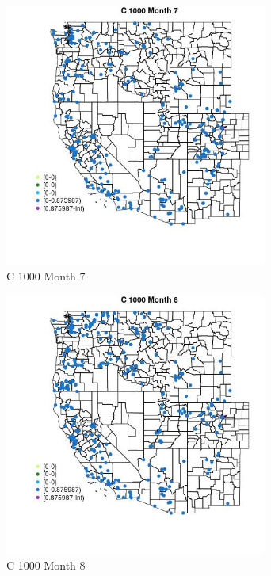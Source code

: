 \begin{figure} 
\centering  
\includegraphics[width=0.77\textwidth]{Code_Outputs/Report_ML_input_PM25_Step4_part_e_de_duplicated_aveswNAs_MapObsMo7C_1000.jpg} 
\caption{\label{fig:Report_ML_input_PM25_Step4_part_e_de_duplicated_aveswNAsMapObsMo7C_1000}C 1000 Month 7} 
\end{figure} 
 

\clearpage 

\begin{figure} 
\centering  
\includegraphics[width=0.77\textwidth]{Code_Outputs/Report_ML_input_PM25_Step4_part_e_de_duplicated_aveswNAs_MapObsMo8C_1000.jpg} 
\caption{\label{fig:Report_ML_input_PM25_Step4_part_e_de_duplicated_aveswNAsMapObsMo8C_1000}C 1000 Month 8} 
\end{figure} 
 

